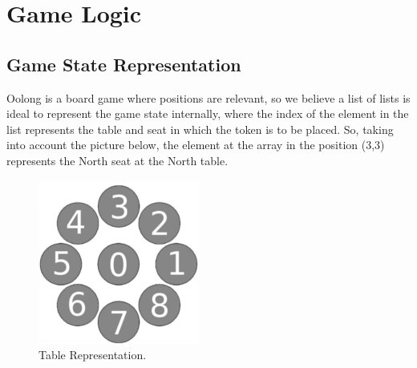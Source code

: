 \documentclass[a4paper]{article}
\begin{document}
\section{Game Logic}

\subsection{Game State Representation}
Oolong is a board game where positions are relevant, so we believe a list of lists is ideal
to represent the game state internally, where the index of the element in the list represents the
table and seat in which the token is to be placed. So, taking into account the picture below, the
element at the array in the position (3,3) represents the North seat at the North table.

\begin{figure}[H]
\centering
{}
  \includegraphics[width=\linewidth]{gameboard.png}
  \caption{Table Representation.}\label{fig:table_rep}
\endminipage\hfill
\end{figure}
\end{document}
